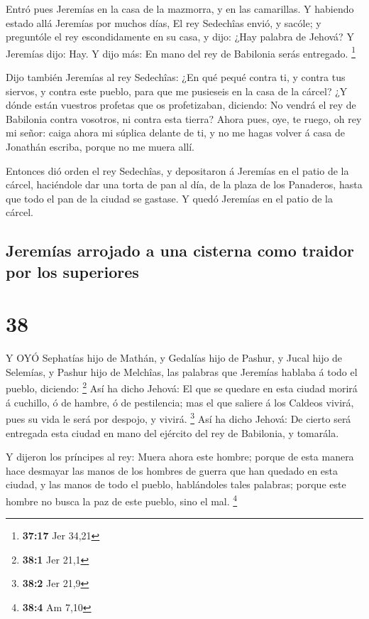  Entró pues Jeremías en la casa de la mazmorra, y en las
camarillas. Y habiendo estado allá Jeremías por muchos días,
 El rey Sedechîas envió, y sacóle; y preguntóle el rey
escondidamente en su casa, y dijo: ¿Hay palabra de Jehová? Y Jeremías
dijo: Hay. Y dijo más: En mano del rey de Babilonia serás entregado.
\footnote{\textbf{37:17} Jer 34,21}

 Dijo también Jeremías al rey Sedechîas: ¿En qué pequé
contra ti, y contra tus siervos, y contra este pueblo, para que me
pusieseis en la casa de la cárcel?  ¿Y dónde están vuestros
profetas que os profetizaban, diciendo: No vendrá el rey de Babilonia
contra vosotros, ni contra esta tierra?  Ahora pues, oye,
te ruego, oh rey mi señor: caiga ahora mi súplica delante de ti, y no me
hagas volver á casa de Jonathán escriba, porque no me muera allí.

 Entonces dió orden el rey Sedechîas, y depositaron á
Jeremías en el patio de la cárcel, haciéndole dar una torta de pan al
día, de la plaza de los Panaderos, hasta que todo el pan de la ciudad se
gastase. Y quedó Jeremías en el patio de la cárcel.

\hypertarget{jeremuxedas-arrojado-a-una-cisterna-como-traidor-por-los-superiores}{%
\subsection{Jeremías arrojado a una cisterna como traidor por los
superiores}\label{jeremuxedas-arrojado-a-una-cisterna-como-traidor-por-los-superiores}}

\hypertarget{section-37}{%
\section{38}\label{section-37}}

 Y OYÓ Sephatías hijo de Mathán, y Gedalías hijo de Pashur,
y Jucal hijo de Selemías, y Pashur hijo de Melchîas, las palabras que
Jeremías hablaba á todo el pueblo, diciendo: \footnote{\textbf{38:1} Jer
  21,1}  Así ha dicho Jehová: El que se quedare en esta
ciudad morirá á cuchillo, ó de hambre, ó de pestilencia; mas el que
saliere á los Caldeos vivirá, pues su vida le será por despojo, y
vivirá. \footnote{\textbf{38:2} Jer 21,9}  Así ha dicho
Jehová: De cierto será entregada esta ciudad en mano del ejército del
rey de Babilonia, y tomarála.

 Y dijeron los príncipes al rey: Muera ahora este hombre;
porque de esta manera hace desmayar las manos de los hombres de guerra
que han quedado en esta ciudad, y las manos de todo el pueblo,
hablándoles tales palabras; porque este hombre no busca la paz de este
pueblo, sino el mal. \footnote{\textbf{38:4} Am 7,10}

